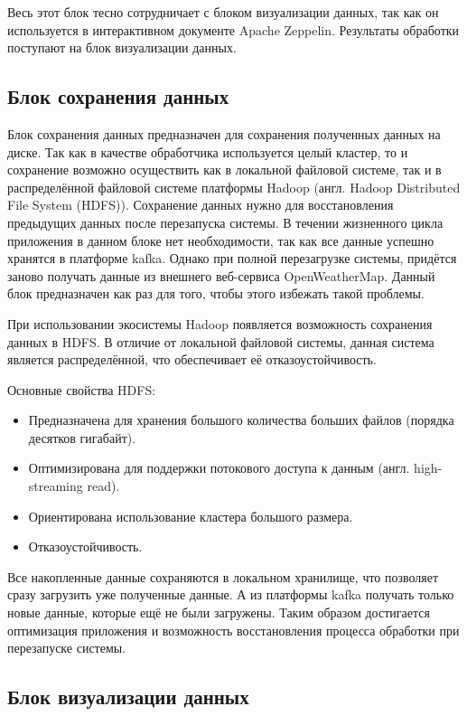 Весь этот блок тесно сотрудничает с блоком визуализации данных, так как он используется в интерактивном документе Apache Zeppelin.
Результаты обработки поступают на блок визуализации данных.

\subsection{Блок сохранения данных}

Блок сохранения данных предназначен для сохранения полученных данных на диске.
Так как в качестве обработчика используется целый кластер, то и сохранение возможно осуществить как в локальной файловой системе, так и в распределённой файловой системе платформы Hadoop (англ. Hadoop Distributed File System (HDFS)).
Сохранение данных нужно для восстановления предыдущих данных после перезапуска системы.
В течении жизненного цикла приложения в данном блоке нет необходимости, так как все данные успешно хранятся в платформе kafka.
Однако при полной перезагрузке системы, придётся заново получать данные из внешнего веб-сервиса OpenWeatherMap. 
Данный блок предназначен как раз для того, чтобы этого избежать такой проблемы.

При использовании экосистемы Hadoop появляется возможность сохранения данных в HDFS.
В отличие от локальной файловой системы, данная система является распределённой, что обеспечивает её отказоустойчивость.

Основные свойства HDFS:
\begin{itemize}
    \item Предназначена для хранения большого количества больших файлов (порядка десятков гигабайт).
    \item Оптимизирована для поддержки потокового доступа к данным (англ. high-streaming read).
    \item Ориентирована использование кластера большого размера.
    \item Отказоустойчивость.
\end{itemize}

Все накопленные данные сохраняются в локальном хранилище, что позволяет сразу загрузить уже полученные данные.
А из платформы kafka получать только новые данные, которые ещё не были загружены.
Таким образом достигается оптимизация приложения и возможность восстановления процесса обработки при перезапуске системы.


\subsection{Блок визуализации данных}


